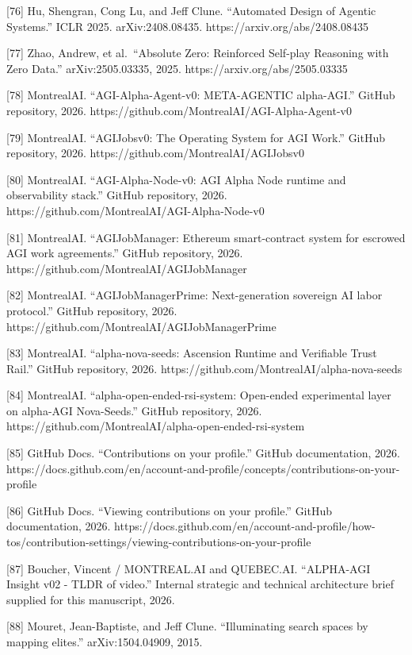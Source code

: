 {[}76{]} Hu, Shengran, Cong Lu, and Jeff Clune. ``Automated Design of
Agentic Systems.'' ICLR 2025. arXiv:2408.08435.
https://arxiv.org/abs/2408.08435

{[}77{]} Zhao, Andrew, et al.~``Absolute Zero: Reinforced Self-play
Reasoning with Zero Data.'' arXiv:2505.03335, 2025.
https://arxiv.org/abs/2505.03335

{[}78{]} MontrealAI. ``AGI-Alpha-Agent-v0: META-AGENTIC alpha-AGI.''
GitHub repository, 2026.
https://github.com/MontrealAI/AGI-Alpha-Agent-v0

{[}79{]} MontrealAI. ``AGIJobsv0: The Operating System for AGI Work.''
GitHub repository, 2026. https://github.com/MontrealAI/AGIJobsv0

{[}80{]} MontrealAI. ``AGI-Alpha-Node-v0: AGI Alpha Node runtime and
observability stack.'' GitHub repository, 2026.
https://github.com/MontrealAI/AGI-Alpha-Node-v0

{[}81{]} MontrealAI. ``AGIJobManager: Ethereum smart-contract system for
escrowed AGI work agreements.'' GitHub repository, 2026.
https://github.com/MontrealAI/AGIJobManager

{[}82{]} MontrealAI. ``AGIJobManagerPrime: Next-generation sovereign AI
labor protocol.'' GitHub repository, 2026.
https://github.com/MontrealAI/AGIJobManagerPrime

{[}83{]} MontrealAI. ``alpha-nova-seeds: Ascension Runtime and
Verifiable Trust Rail.'' GitHub repository, 2026.
https://github.com/MontrealAI/alpha-nova-seeds

{[}84{]} MontrealAI. ``alpha-open-ended-rsi-system: Open-ended
experimental layer on alpha-AGI Nova-Seeds.'' GitHub repository, 2026.
https://github.com/MontrealAI/alpha-open-ended-rsi-system

{[}85{]} GitHub Docs. ``Contributions on your profile.'' GitHub
documentation, 2026.
https://docs.github.com/en/account-and-profile/concepts/contributions-on-your-profile

{[}86{]} GitHub Docs. ``Viewing contributions on your profile.'' GitHub
documentation, 2026.
https://docs.github.com/en/account-and-profile/how-tos/contribution-settings/viewing-contributions-on-your-profile

{[}87{]} Boucher, Vincent / MONTREAL.AI and QUEBEC.AI. ``ALPHA-AGI
Insight v02 - TLDR of video.'' Internal strategic and technical
architecture brief supplied for this manuscript, 2026.

{[}88{]} Mouret, Jean-Baptiste, and Jeff Clune. ``Illuminating search
spaces by mapping elites.'' arXiv:1504.04909, 2015.

